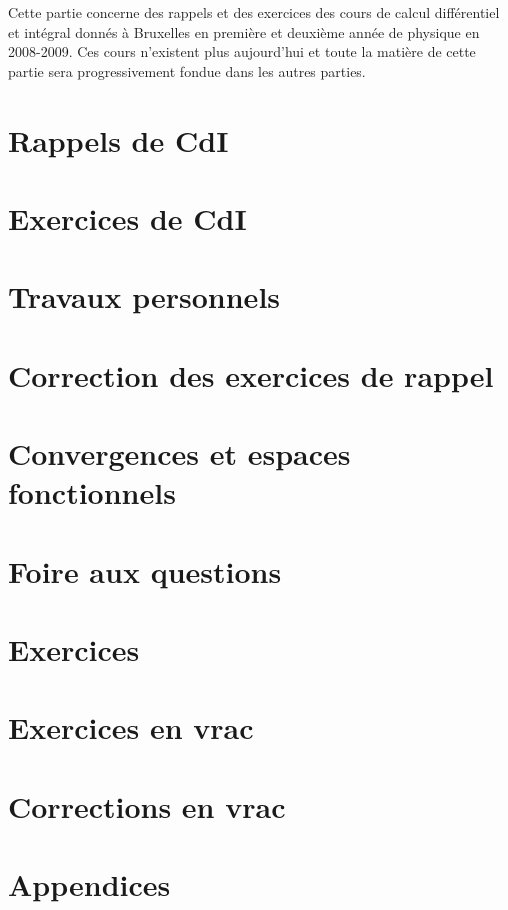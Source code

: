 Cette partie concerne des rappels et des exercices des cours de calcul différentiel et intégral donnés à Bruxelles en première et deuxième année de physique en 2008-2009. Ces cours n'existent plus aujourd'hui et toute la matière de cette partie sera progressivement fondue dans les autres parties.

\chapter{Rappels de CdI}


\chapter{Exercices de CdI}


\chapter{Travaux personnels}


\chapter{Correction des exercices de rappel}



\chapter{Convergences et espaces fonctionnels}
	

\chapter{Foire aux questions}
	

\chapter{Exercices}
	
	

\chapter{Exercices en vrac} %



 
\chapter{Corrections en vrac}   %



\chapter{Appendices}

